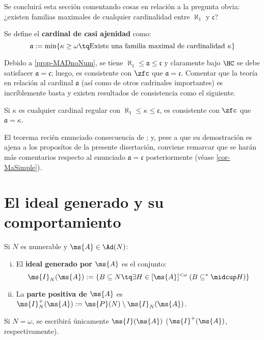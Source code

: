 	Se concluirá esta sección comentando cosas en relación a la pregunta obvia: ¿existen familias maximales de cualquier cardinalidad entre $\aleph_1$ y $\mathfrak{c}$?
	
	\begin{definicion}
		Se define el \textbf{cardinal de casi ajenidad} como: 
		$$ \mathfrak{a}:=\min\{ \kappa \geq \omega \tq \text{Existe una familia maximal de cardinalidad } \kappa \} $$
	\end{definicion}
	
	Debido a \ref{prop-MADnoNum}, se tiene $\aleph_1 \leq \mathfrak{a} \leq \mathfrak{c}$ y claramente bajo $\HC$ se debe satisfacer $\mathfrak{a}=\mathfrak{c}$; luego, es consistente con $\zfc$ que $\mathfrak{a}=\mathfrak{c}$. Comentar que la teoría en relación al cardinal $\mathfrak{a}$ (así como de otros cadrinales importantes) es incríblemente basta y existen resultados de consistencia como el siguiente.
	
	\begin{teorema}\label{teo-stafa}
		Si $\kappa$ es cualquier cardinal regular con $\aleph_1 \leq \kappa \leq \mathfrak{c}$, es consistente con $\zfc$ que $\mathfrak{a}=\kappa$.
	\end{teorema}

	El teorema recién enunciado consecuencia de \cite[Teo.~5.1, p.~127]{kunenHandbook}; y, pese a que su demostración es ajena a los proposítos de la presente disertación, conviene remarcar que se harán más comentarios respecto al enunciado $\mathfrak{a}=\mathfrak{c}$ posteriormente (véase \ref{cor-MaSimple}).

	\section{El ideal generado y su comportamiento}
	\label{Sec-IdealGenerado}
	\index[sym]{$\ms{I}^+(\ms{A})$}
	\begin{definicion}\label{def-ideal}
		Si $N$ es numerable y $\ms{A} \in \Ad(N)$:
		\begin{enumerate}[i)]
			\item El \textbf{ideal generado por $\ms{A}$} es el conjunto:
			$$ \ms{I}_N(\ms{A}) := \{ B \subseteq N \tq \exists H \in [\ms{A}]^{<\omega} \: ( B \subseteq^* \midcup H ) \} $$
			\item La \textbf{parte positiva de $\ms{A}$} es $ \ms{I}_N^+(\ms{A}) := \ms{P}(N) \setminus \ms{I}_N(\ms{A})$.
		\end{enumerate}
		Si $N=\omega$, se escribirá únicamente $\ms{I}(\ms{A})$ ($\ms{I}^+(\ms{A})$, respectivamente).
	\end{definicion}

